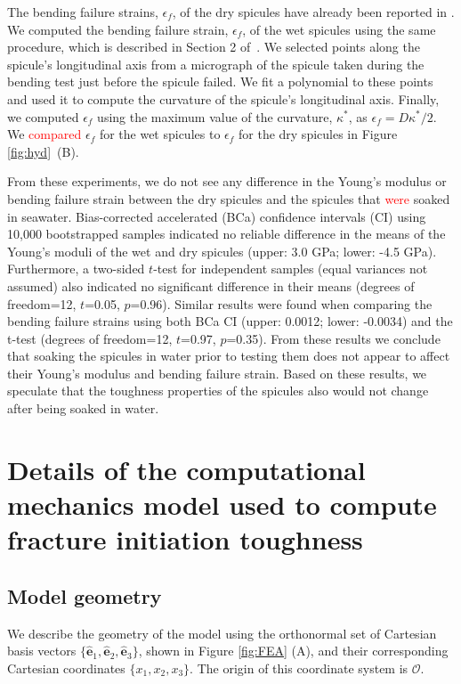 \documentclass[12pt,onecolumn]{article}
\newcommand{\ex}{{\bm{\hat{e}}}_1}
\newcommand{\ey}{{\bm{\hat{e}}}_2}
\newcommand{\ez}{{\bm{\hat{e}}}_3}
\begin{document}
\begin{bibunit}
The bending failure strains, $\epsilon_f$, of the dry spicules have already been reported in \cite{monn2017enhanced}. We computed the bending failure strain, $\epsilon_f$, of the wet spicules using the same procedure, which is described in Section 2 of~\cite{monn2017enhanced}. We selected points along the spicule's longitudinal axis from a micrograph of the spicule taken during the bending test just before the spicule failed. We fit a polynomial to these points and used it to compute the curvature of the spicule's longitudinal axis. Finally, we computed $\epsilon_f$ using the maximum value of the curvature, $\kappa^*$, as $\epsilon_f=D \kappa^*/2$. We \textcolor{red}{compared} $\epsilon_f$ for the wet spicules to $\epsilon_f$ for the dry spicules in Figure \ref{fig:hyd}~(B). 

From these experiments, we do not see any difference in the Young's modulus or bending failure strain between the dry spicules and the spicules that \textcolor{red}{were} soaked in seawater. Bias-corrected accelerated (BCa) confidence intervals (CI) using 10,000 bootstrapped samples indicated no reliable difference in the means of the Young's moduli of the wet and dry spicules (upper: 3.0 GPa; lower: -4.5 GPa). Furthermore, a two-sided $t$-test for independent samples (equal variances not assumed) also indicated no significant difference in their means (degrees of freedom=12, $t$=0.05, $p$=0.96). Similar results were found when comparing the bending failure strains using both BCa CI (upper: 0.0012; lower: -0.0034) and the t-test (degrees of freedom=12, $t$=0.97, $p$=0.35). From these results we conclude that soaking the spicules in water prior to testing them does not appear to affect their Young's modulus and bending failure strain. Based on these results, we speculate that the toughness properties of the spicules also would not change after being soaked in water.

\section{Details of the computational mechanics model used to compute fracture initiation toughness}
\label{sec:Vextmethod}

\subsection{Model geometry}
We describe the geometry of the model using the orthonormal set of Cartesian basis vectors $\{\ex,\ey,\ez\}$, shown in Figure \ref{fig:FEA} (A), and their corresponding Cartesian coordinates $\{x_1,x_2,x_3\}$. The origin of this coordinate system is $\mathcal{O}$.


\end{bibunit}
\end{document}
